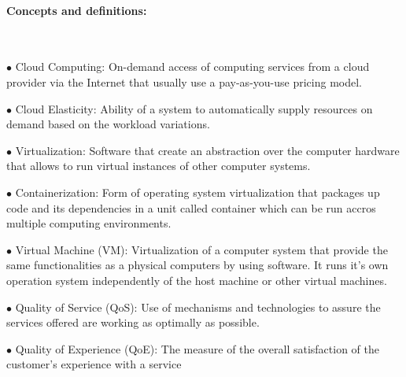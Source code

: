 \documentclass[11pt]{article}
\begin{document}
\paragraph{Concepts and definitions:} 
~\newline ~\newline
\begin{minipage}[t]{1\textwidth}
    \begin{description}
    \item $\bullet$ Cloud Computing: On-demand access of computing services from a cloud provider via the Internet that usually use a pay-as-you-use pricing model.
    \item $\bullet$ Cloud Elasticity: Ability of a system to automatically supply resources on demand based on the workload variations.
    \item $\bullet$ Virtualization: Software that create an abstraction over the computer hardware that allows to run virtual instances of other computer systems. 

    \end{description}
\end{minipage}

\begin{minipage}[t]{1\textwidth}
    \begin{description}
        \item $\bullet$ Containerization: Form of operating system virtualization that packages up code and its dependencies in a unit called container which can be run accros multiple computing environments.
        \item $\bullet$ Virtual Machine (VM): Virtualization of a computer system that provide the same functionalities as a physical computers by using software. It runs it's own operation system independently of the host machine or other virtual machines.
        \item $\bullet$ Quality of Service (QoS): Use of mechanisms and technologies to assure the services offered are working as optimally as possible.
        \item $\bullet$ Quality of Experience (QoE): The measure of the overall satisfaction of the customer's experience with a service
    \end{description}
\end{minipage}

~\newline
\end{document}
